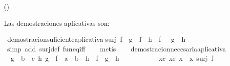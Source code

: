 \begin{isabellebody}
\begin{isamarkuptext}
\begin{itemize}
      \hfill ()
  \end{itemize}%
\end{isamarkuptext}\isamarkuptrue%
%
\isadelimdocument
%
\endisadelimdocument
%
\isatagdocument
%
\isamarkuptrue%
%
\endisatagdocument
{\isafolddocument}%
%
\isadelimdocument
%
\endisadelimdocument
%
\begin{isamarkuptext}%
Las demostraciones aplicativas son:%
\end{isamarkuptext}\isamarkuptrue%
\isamarkupfalse%
\ demostracion{\isacharunderscore}suficiente{\isacharunderscore}aplicativa{\isacharcolon}\isanewline
{\isachardoublequoteopen}surj\ f\ {\isasymLongrightarrow}\ {\isacharparenleft}{\isacharparenleft}g\ {\isasymcirc}\ f{\isacharparenright}\ {\isacharequal}\ {\isacharparenleft}h\ {\isasymcirc}\ f{\isacharparenright}\ {\isacharparenright}\ {\isasymlongrightarrow}\ {\isacharparenleft}g\ {\isacharequal}\ h{\isacharparenright}{\isachardoublequoteclose}\isanewline
%
\isadelimproof
\ \ %
\endisadelimproof
%
\isatagproof
{}\isamarkupfalse%
\ {\isacharparenleft}simp\ add{\isacharcolon}\ surj{\isacharunderscore}def\ fun{\isacharunderscore}eq{\isacharunderscore}iff{\isacharparenright}\isanewline
\ \ \isamarkupfalse%
\ metis\isanewline
\ \ \isamarkupfalse%
%
\endisatagproof
{\isafoldproof}%
%
\isadelimproof
\isanewline
%
\endisadelimproof
\isanewline
{}\isamarkupfalse%
\ demostracion{\isacharunderscore}necesaria{\isacharunderscore}aplicativa{\isacharcolon}\isanewline
\ \ {\isachardoublequoteopen}{\isasymlbrakk}{\isasymforall}{\isacharparenleft}g\ {\isacharcolon}{\isacharcolon}\ {\isacharprime}b\ {\isasymRightarrow}\ {\isacharprime}c{\isacharparenright}\ h\ {\isachardot}{\isacharparenleft}g\ {\isasymcirc}\ {\isacharparenleft}f\ {\isacharcolon}{\isacharcolon}\ {\isacharprime}a\ {\isasymRightarrow}\ {\isacharprime}b{\isacharparenright}\ {\isacharequal}\ h\ {\isasymcirc}\ f{\isacharparenright}\ {\isasymlongrightarrow}\ {\isacharparenleft}g\ {\isacharequal}\ h{\isacharparenright}{\isacharsemicolon}\isanewline
\ \ \ \ \ \ \ \ \ \ {\isasymexists}\ {\isacharparenleft}x{}{\isacharcolon}{\isacharcolon}{\isacharprime}c{\isacharparenright}\ {\isacharparenleft}x{}{\isacharcolon}{\isacharcolon}{\isacharprime}c{\isacharparenright}{\isachardot}\ x{}\ {\isasymnoteq}\ x{}{\isasymrbrakk}{\isasymLongrightarrow}\ surj\ f{\isachardoublequoteclose}\isanewline
%
\isadelimproof
\ \ %
\endisadelimproof
%
\isatagproof

\end{isabellebody}
